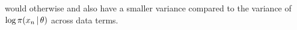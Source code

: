 \documentclass[angelino.tex]{subfiles}
\begin{document}
would otherwise and also have a smaller variance compared to the variance
of~$\log \pi(x_n \,|\, \theta)$ across data terms.
%
%
\end{document}
